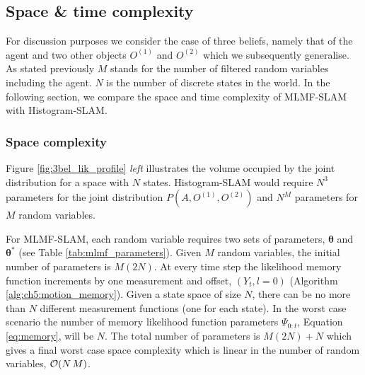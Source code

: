\subsection{Space \& time complexity}\label{ch5:space_time_complexity_MLMF}

For discussion purposes we consider the case of three beliefs, namely that of the agent and two other objects $O^{(1)}$ and $O^{(2)}$ which we
subsequently generalise. As stated previously $M$ stands for the number of filtered random variables including the agent. 
$N$ is the number of discrete states in the world. In the following section, we compare the space and time complexity 
of MLMF-SLAM with Histogram-SLAM.


\subsubsection{Space complexity}

Figure \ref{fig:3bel_lik_profile} \textit{left} illustrates the volume occupied by the joint distribution
for a space with $N$ states. Histogram-SLAM would require $N^3$ parameters for the joint distribution $P(A,O^{(1)},O^{(2)})$ and $N^{M}$ parameters for $M$ random variables. 

For MLMF-SLAM, each random variable requires two sets of parameters, $\boldsymbol{\theta}$ and $\boldsymbol{\theta}^*$ 
(see Table \ref{tab:mlmf_parameters}). Given
$M$ random variables, the initial number of parameters is $M (2 N)$.
At every time step the likelihood memory function increments by one measurement and offset, $(Y_t,l=0)$ (Algorithm \ref{alg:ch5:motion_memory}).
Given a state space of size $N$, there can be no more than $N$ different measurement functions (one for each state). In
the worst case scenario the number of memory likelihood function parameters $\Psi_{0:t}$, Equation \ref{eq:memory}, will be $N$.
The total number of parameters is $M (2 N) + N$ which gives a final worst case space complexity which is linear in the number of 
random variables, $\operatorname{\mathcal{O}}(N\,M)$. 

